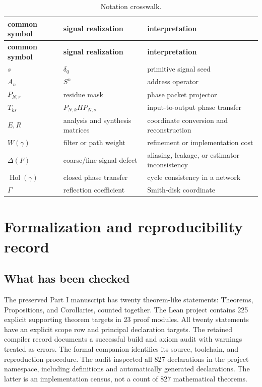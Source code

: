 \documentclass[11pt,letterpaper]{article}
\theoremstyle{plain}
\theoremstyle{plain}
\theoremstyle{plain}
\theoremstyle{definition}
\theoremstyle{definition}
\theoremstyle{definition}
\theoremstyle{definition}
\theoremstyle{remark}
\theoremstyle{remark}
\theoremstyle{remark}
\theoremstyle{remark}
\newcommand{\Gam}{\Gamma}
\begin{document}
\begin{longtable}{L{0.20\textwidth}L{0.33\textwidth}L{0.37\textwidth}}
\caption{Notation crosswalk.}\label{tab:notation}\\
\toprule
\textbf{common symbol}&\textbf{signal realization}&\textbf{interpretation}\\
\midrule
\endfirsthead
\toprule
\textbf{common symbol}&\textbf{signal realization}&\textbf{interpretation}\\
\midrule
\endhead
$s$&$\delta_0$&primitive signal seed\\
$A_n$&$S^n$&address operator\\
$P_{N,r}$&residue mask&phase packet projector\\
$T_{ks}$&$P_{N,k}HP_{N,s}$&input-to-output phase transfer\\
$E,R$&analysis and synthesis matrices&coordinate conversion and reconstruction\\
$W(\gamma)$&filter or path weight&refinement or implementation cost\\
$\Delta(F)$&coarse/fine signal defect&aliasing, leakage, or estimator inconsistency\\
$\operatorname{Hol}(\gamma)$&closed phase transfer&cycle consistency in a network\\
$\Gam$&reflection coefficient&Smith-disk coordinate\\
\bottomrule
\end{longtable}

\clearpage
\section{Formalization and reproducibility record}\label{core:section:21}\label{sec:formalization}

\subsection{What has been checked}

The preserved Part I manuscript has twenty theorem-like statements: Theorems, Propositions, and Corollaries, counted together. The Lean project contains 225 explicit supporting theorem targets in 23 proof modules. All twenty statements have an explicit scope row and principal declaration targets. The retained compiler record documents a successful build and axiom audit with warnings treated as errors. The formal companion identifies its source, toolchain, and reproduction procedure. The audit inspected all 827 declarations in the project namespace, including definitions and automatically generated declarations. The latter is an implementation census, not a count of 827 mathematical theorems.
\end{document}
